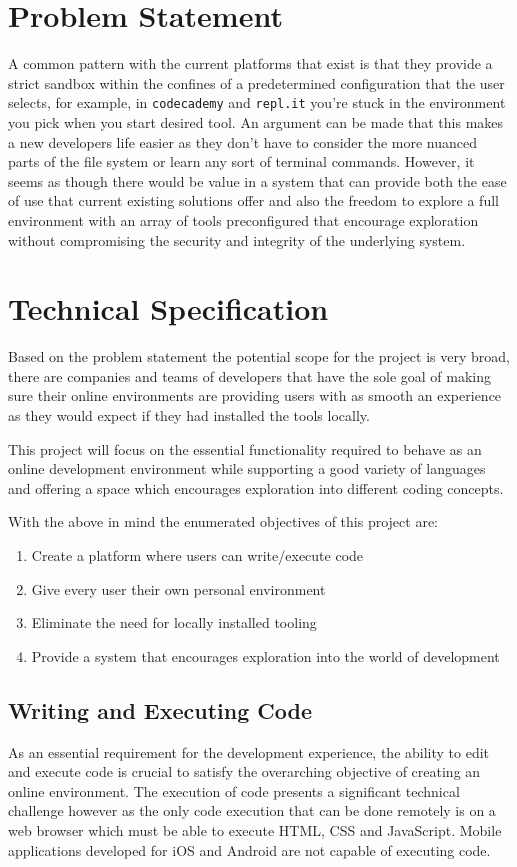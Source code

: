 \section{Problem Statement} \label{section:probstate}
A common pattern with the current platforms that exist is that they provide a strict sandbox within the confines of a predetermined configuration that the user selects, for example, in \texttt{codecademy} and \texttt{repl.it} you're stuck in the environment you pick when you start desired tool. An argument can be made that this makes a new developers life easier as they don't have to consider the more nuanced parts of the file system or learn any sort of terminal commands. However, it seems as though there would be value in a system that can provide both the ease of use that current existing solutions offer and also the freedom to explore a full environment with an array of tools preconfigured that encourage exploration without compromising the security and integrity of the underlying system.

\section{Technical Specification} \label{section:techspec}
Based on the problem statement the potential scope for the project is very broad, there are companies and teams of developers that have the sole goal of making sure their online environments are providing users with as smooth an experience as they would expect if they had installed the tools locally.

This project will focus on the essential functionality required to behave as an online development environment while supporting a good variety of languages and offering a space which encourages exploration into different coding concepts.

With the above in mind the enumerated objectives of this project are: 
\begin{enumerate}
    \item Create a platform where users can write/execute code
    \item Give every user their own personal environment
    \item Eliminate the need for locally installed tooling
    \item Provide a system that encourages exploration into the world of development
\end{enumerate}

\subsection{Writing and Executing Code}
As an essential requirement for the development experience, the ability to edit and execute code is crucial to satisfy the overarching objective of creating an online environment. The execution of code presents a significant technical challenge however as the only code execution that can be done remotely is on a web browser which must be able to execute HTML, CSS and JavaScript. Mobile applications developed for iOS and Android are not capable of executing code.


